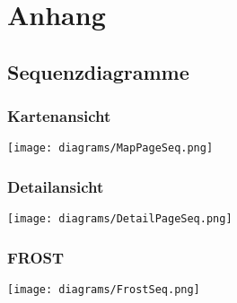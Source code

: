 \section{Anhang}
\subsection{Sequenzdiagramme}
\subsubsection*{Kartenansicht}
\texttt{[image: diagrams/MapPageSeq.png]}

\subsubsection*{Detailansicht}
\texttt{[image: diagrams/DetailPageSeq.png]}

\subsubsection*{FROST}
\texttt{[image: diagrams/FrostSeq.png]}